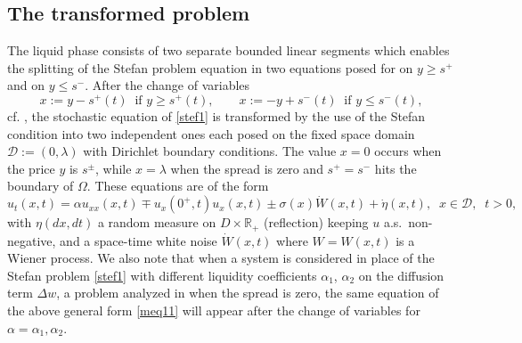 \documentclass[reqno]{amsart}
\numberwithin{equation}{section}
\begin{document}

\subsection{The transformed problem}
The liquid phase consists of two separate bounded linear segments which enables the splitting of the Stefan problem equation in two equations posed for on $y\geq s^+$ and on $y\leq s^-$. After the
change of variables
\begin{equation*}\label{cv1gen}
x:= y-s^+(t) \;\; \text{if }y\geq s^+(t), \qquad
x:=-y+s^-(t) \;\; \text{if }y\leq s^-(t),
\end{equation*}
cf. \cite{AFK2}, the stochastic equation of \eqref{stef1} is transformed by the use of the Stefan condition into two independent ones each posed on the fixed space domain $\mathcal{D}:=(0,\lambda)$ with Dirichlet boundary conditions. The value $ x=0 $ occurs when the price $y$ is $s^{\pm}$, while $x=\lambda$ when the spread is zero and $s^+=s^-$ hits the boundary of $\Omega$. These equations are of the form
\begin{equation}\label{meq11}
u_t(x,t)=\alpha  u_{xx}(x,t)\mp u_x(0^+,t)
u_x(x,t)\pm\sigma(x)\dot{W}(x,t)+\dot{\eta}(x,t),\;\;x\in\mathcal{D},\;\;t>0,
\end{equation}
with $\eta(dx,dt)$ a random measure on $ D\times \mathbb R_+ $ (reflection) keeping $u$ a.s.\ non-negative, and a space-time white noise $\dot{W}(x,t)$ where $W=W(x,t)$ is a Wiener process. We also note that when a system is considered in place of the Stefan problem \eqref{stef1} with different liquidity coefficients $\alpha_1$, $\alpha_2$ on the diffusion term $\Delta w$, a problem analyzed in \cite{BH} when the spread is zero, the same equation of the above general form \eqref{meq11} will appear after the change of variables for $\alpha=\alpha_1,\alpha_2$.
\end{document}
